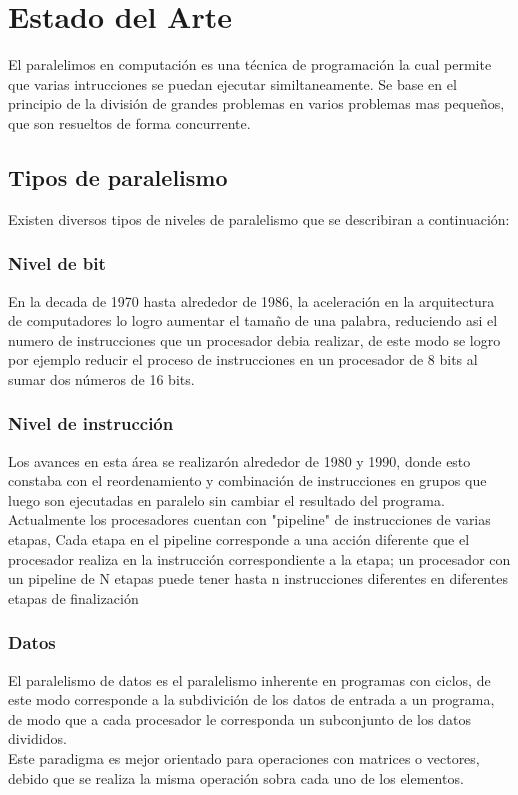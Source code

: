 \chapter[Estado del Arte]{\label{ch:estado-arte}Estado del Arte}

El paralelimos en computación es una técnica de programación la cual permite que varias intrucciones se puedan ejecutar similtaneamente. Se base en el principio de la división de grandes problemas en varios problemas mas pequeños, que son resueltos de forma concurrente.
\\
\section{Tipos de paralelismo}
Existen diversos tipos de niveles de paralelismo que se describiran a continuación:
\subsection{Nivel de bit}
En la decada de 1970 hasta alrededor de 1986, la aceleración en la arquitectura de computadores lo logro aumentar el tamaño de una palabra, reduciendo asi el numero de instrucciones que un procesador debia realizar, de este modo se logro por ejemplo reducir el proceso de instrucciones en un procesador de 8 bits al sumar dos números de 16 bits.

\subsection{Nivel de instrucción}
Los avances en esta área se realizarón alrededor de 1980 y 1990, donde esto constaba con el reordenamiento y combinación de instrucciones en grupos que luego son ejecutadas en paralelo sin cambiar el resultado del programa. Actualmente los procesadores cuentan con "pipeline" de instrucciones de varias etapas, Cada etapa en el pipeline corresponde a una acción diferente que el procesador realiza en la instrucción correspondiente a la etapa; un procesador con un pipeline de N etapas puede tener hasta n instrucciones diferentes en diferentes etapas de finalización
\subsection{Datos}

El paralelismo de datos es el paralelismo inherente en programas con ciclos, de este modo corresponde a la subdivición de los datos de entrada a un programa, de modo que a cada procesador le corresponda un subconjunto de los datos divididos.\\
Este paradigma es mejor orientado para operaciones con matrices o vectores, debido que se realiza la misma operación sobra cada uno de los elementos.


